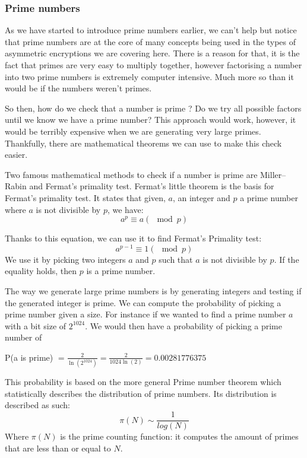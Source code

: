 \documentclass[conference]{IEEEtran}
\begin{document}
\subsubsection{Prime numbers}
As we have started to introduce prime numbers earlier, we can't help 
but notice that prime numbers are at the core of many concepts being
used in the types of  asymmetric encryptions we are covering here. 
There is a reason for that, it is the fact that primes are very easy to 
multiply together, however factorising a number into two prime numbers is 
extremely computer intensive. Much more so than it would be if the numbers 
weren't primes. 

So then, how do we check that a number is prime ? Do we try all possible factors
until we know we have a prime number? This approach would work, however, it 
would be terribly expensive when we are generating very large primes.
Thankfully, there are mathematical theorems we can use to make this check easier.

Two famous mathematical methods to check if a number is prime 
are Miller–Rabin and Fermat's primality test. 
Fermat's little theorem is the basis for Fermat's primality test. It states that
given, $a$, an integer and $p$ a prime number where $a$ is not divisible by $p$, we have:
\begin{equation*}
    a^{p} \equiv a (\mod p)
\end{equation*}

Thanks to this equation, we can use it to find Fermat's Primality test: 
\begin{equation*}
    a^{p - 1} \equiv 1 (\mod p)
\end{equation*}
We use it by picking two integers $a$ and $p$ such that $a$ is not divisible by $p$.
If the equality holds, then $p$ is a prime number.

The way we generate large prime numbers is by generating integers and testing if the generated integer is
prime. We can compute the probability of picking a prime number given a size. For instance if we wanted to 
find a prime number $a$ with a bit size of $2^{1024}$. We would then have a probability of picking a prime
number of \\
\begin{center}
    P(a is prime) $= \frac{2}{\ln(2^{1024})} = \frac{2}{1024\ln(2)} = 0.00281776375$
\end{center}
This probability is based on the more general Prime number theorem which statistically describes the distribution of prime numbers.
Its distribution is described as such:
\begin{equation*}
    \pi(N) \sim \frac{1}{log(N)}
\end{equation*}
Where $\pi(N)$ is the prime counting function: it computes the amount of primes
that are less than or equal to $N$.
\end{document}
